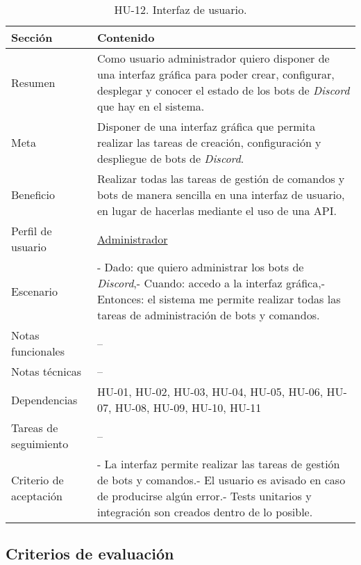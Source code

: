 \begin{table}[H]
    \centering
    \def\arraystretch{1.25}
    \begin{adjustbox}{max width=\textwidth}
    \begin{tabularx}{\textwidth}{l|L}
    \hline
        \textbf{Sección} & \textbf{Contenido} \\ \hline
    \hline
        Resumen & Como usuario administrador quiero disponer de una interfaz gráfica para poder crear, configurar, desplegar y conocer el estado de los bots de \textit{Discord} que hay en el sistema. \\ \hline
        Meta & Disponer de una interfaz gráfica que permita realizar las tareas de creación, configuración y despliegue de bots de \textit{Discord}. \\ \hline
        Beneficio & Realizar todas las tareas de gestión de comandos y bots de manera sencilla en una interfaz de usuario, en lugar de hacerlas mediante el uso de una API. \\ \hline
        Perfil de usuario & \hyperref[sec:personaAdmin]{Administrador} \\ \hline
        Escenario & - Dado: que quiero administrar los bots de \textit{Discord},\linebreak - Cuando: accedo a la interfaz gráfica,\linebreak - Entonces: el sistema me permite realizar todas las tareas de administración de bots y comandos. \\ \hline
        Notas funcionales & – \\ \hline
        Notas técnicas & – \\ \hline
        Dependencias & HU-01, HU-02, HU-03, HU-04, HU-05, HU-06, HU-07, HU-08, HU-09, HU-10, HU-11 \\ \hline
        Tareas de seguimiento & – \\ \hline
        Criterio de aceptación & - La interfaz permite realizar las tareas de gestión de bots y comandos.\linebreak - El usuario es avisado en caso de producirse algún error.\linebreak - Tests unitarios y integración son creados dentro de lo posible. \\ \hline
    \end{tabularx}
    \end{adjustbox}
    \caption{HU-12. Interfaz de usuario.}
\end{table}

\subsection{Criterios de evaluación}

